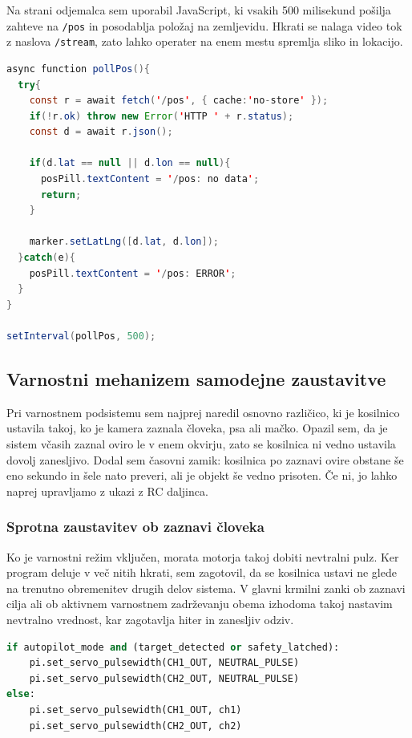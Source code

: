 \documentclass[12pt]{article}
\begin{document}
Na strani odjemalca sem uporabil JavaScript, ki vsakih 500 milisekund pošilja zahteve na \texttt{/pos} in posodablja položaj na
zemljevidu. Hkrati se nalaga video tok z naslova \texttt{/stream},
zato lahko operater na enem mestu spremlja sliko in lokacijo.

\begin{lstlisting}[language=Java,
  caption={Periodično pridobivanje položaja in posodabljanje
    zemljevida.}]
async function pollPos(){
  try{
    const r = await fetch('/pos', { cache:'no-store' });
    if(!r.ok) throw new Error('HTTP ' + r.status);
    const d = await r.json();

    if(d.lat == null || d.lon == null){
      posPill.textContent = '/pos: no data';
      return;
    }

    marker.setLatLng([d.lat, d.lon]);
  }catch(e){
    posPill.textContent = '/pos: ERROR';
  }
}

setInterval(pollPos, 500);
\end{lstlisting}

\subsection{Varnostni mehanizem samodejne zaustavitve}

Pri varnostnem podsistemu sem najprej naredil osnovno različico, ki je
kosilnico ustavila takoj, ko je kamera zaznala človeka, psa ali mačko.
Opazil sem, da je sistem včasih zaznal oviro le v enem okvirju, zato
se kosilnica ni vedno ustavila dovolj zanesljivo. Dodal sem časovni
zamik: kosilnica po zaznavi ovire obstane še eno sekundo in šele nato
preveri, ali je objekt še vedno prisoten. Če ni, jo lahko naprej upravljamo z ukazi z RC daljinca.

\subsubsection{Sprotna zaustavitev ob zaznavi človeka}

Ko je varnostni režim vključen, morata motorja takoj dobiti nevtralni
pulz. Ker program deluje v več nitih hkrati, sem zagotovil, da se
kosilnica ustavi ne glede na trenutno obremenitev drugih delov sistema.
V glavni krmilni zanki ob zaznavi cilja ali ob aktivnem varnostnem
zadrževanju obema izhodoma takoj nastavim nevtralno vrednost, kar
zagotavlja hiter in zanesljiv odziv.

\begin{lstlisting}[language=Python,
  caption={Samodejna zaustavitev ob zaznanih preprekah.}]
if autopilot_mode and (target_detected or safety_latched):
    pi.set_servo_pulsewidth(CH1_OUT, NEUTRAL_PULSE)
    pi.set_servo_pulsewidth(CH2_OUT, NEUTRAL_PULSE)
else:
    pi.set_servo_pulsewidth(CH1_OUT, ch1)
    pi.set_servo_pulsewidth(CH2_OUT, ch2)
\end{lstlisting}
\end{document}

